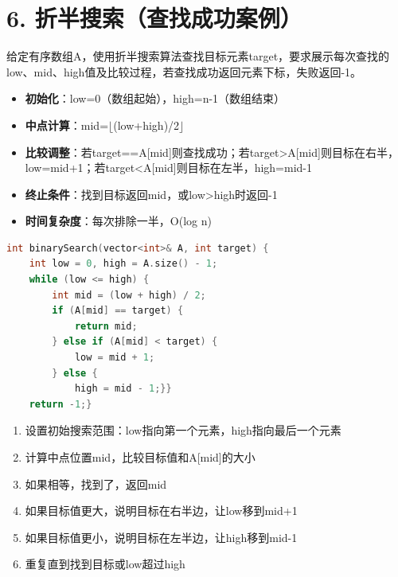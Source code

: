 \section*{6. 折半搜索（查找成功案例）}
给定有序数组A，使用折半搜索算法查找目标元素target，要求展示每次查找的low、mid、high值及比较过程，若查找成功返回元素下标，失败返回-1。
\begin{itemize}
    \item \textbf{初始化}：low=0（数组起始），high=n-1（数组结束）
    \item \textbf{中点计算}：mid=$\lfloor$(low+high)/2$\rfloor$
    \item \textbf{比较调整}：若target==A[mid]则查找成功；若target>A[mid]则目标在右半，low=mid+1；若target<A[mid]则目标在左半，high=mid-1
    \item \textbf{终止条件}：找到目标返回mid，或low>high时返回-1
    \item \textbf{时间复杂度}：每次排除一半，O(log n)
\end{itemize}
\begin{lstlisting}[language=C++, style=cppstyle]
int binarySearch(vector<int>& A, int target) {
    int low = 0, high = A.size() - 1;
    while (low <= high) {
        int mid = (low + high) / 2;
        if (A[mid] == target) {
            return mid;
        } else if (A[mid] < target) {
            low = mid + 1;
        } else {
            high = mid - 1;}}
    return -1;}
\end{lstlisting}

\begin{enumerate}
    \item 设置初始搜索范围：low指向第一个元素，high指向最后一个元素
    \item 计算中点位置mid，比较目标值和A[mid]的大小
    \item 如果相等，找到了，返回mid
    \item 如果目标值更大，说明目标在右半边，让low移到mid+1
    \item 如果目标值更小，说明目标在左半边，让high移到mid-1
    \item 重复直到找到目标或low超过high
\end{enumerate}
